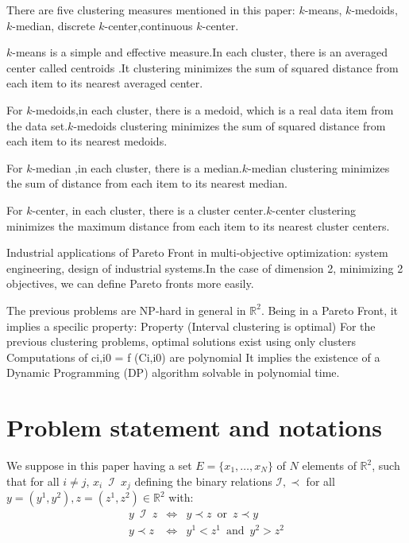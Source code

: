 \documentclass{meta}
\def\RR{{\mathbb{R}}}
\begin{document}
There are five clustering measures mentioned in this paper: $k$-means,  $k$-medoids, $k$-median, discrete $k$-center,continuous  $k$-center.

$k$-means is a simple and effective measure.In each cluster, there is an averaged center called centroids .It clustering minimizes the sum of squared distance from each item to its nearest averaged center.

For $k$-medoids,in each cluster, there is a medoid, which is a real data item from the data set.$k$-medoids clustering minimizes the sum of squared distance from each item to its nearest medoids.

For $k$-median ,in each cluster, there is a median.$k$-median clustering minimizes the sum of distance from each item to its nearest median.

For $k$-center, in each cluster, there is a cluster center.$k$-center clustering minimizes the maximum distance from each item to its nearest cluster centers.

Industrial applications of Pareto Front in multi-objective optimization: system engineering, design of industrial systems.In the case of dimension 2, minimizing 2 objectives, we can define Pareto fronts more easily.

The previous problems are NP-hard in general in  $\RR^2$.
Being in a Pareto Front, it implies a specilic property:
Property (Interval clustering is optimal) For the previous clustering problems, optimal solutions exist using only clusters 
Computations of ci,i0 = f (Ci,i0) are polynomial It implies the existence of a Dynamic Programming (DP) algorithm solvable in polynomial time.


\section{Problem statement and notations}






We suppose in this paper having a set $E=\{x_1,\dots, x_N\}$ of $N$ elements of $\RR^2$, %
such that for all $ i\neq j$, $x_i \phantom{0} \mathcal{I} \phantom{0} x_j$  
defining the binary relations $\mathcal{I},\prec $  for all $ y=(y^1,y^2),z=(z^1,z^2) \in \RR^2$ with:
\begin{eqnarray}
y \phantom{1}\mathcal{I}\phantom{1} z  & \Longleftrightarrow  &y \prec z  \phantom{2} \mbox{or} \phantom{2}  z \prec y \\
 y \prec z  & \Longleftrightarrow  & y^1< z^1 \phantom{2} \mbox{and}\phantom{2} y^2> z^2
\end{eqnarray}
\end{document}
